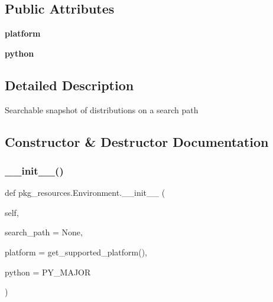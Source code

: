 \subsection*{Public Attributes}
\begin{DoxyCompactItemize}
\item 
\mbox{\label{classpkg__resources_1_1_environment_a8512772df91acc77fc4ea47e2d483e7a}} 
{\bfseries platform}
\item 
\mbox{\label{classpkg__resources_1_1_environment_a92643caa8139bba1bd63c32c22d1878c}} 
{\bfseries python}
\end{DoxyCompactItemize}


\subsection{Detailed Description}
\begin{DoxyVerb}Searchable snapshot of distributions on a search path\end{DoxyVerb}
 

\subsection{Constructor \& Destructor Documentation}
\mbox{\label{classpkg__resources_1_1_environment_ac17977fcfff1f90f694316f938090eb2}} 
\subsubsection{\texorpdfstring{\+\_\+\+\_\+init\+\_\+\+\_\+()}{\_\_init\_\_()}}
{\footnotesize\ttfamily def pkg\+\_\+resources.\+Environment.\+\_\+\+\_\+init\+\_\+\+\_\+ (\begin{DoxyParamCaption}\item[{}]{self,  }\item[{}]{search\+\_\+path = {\ttfamily None},  }\item[{}]{platform = {\ttfamily get\+\_\+supported\+\_\+platform()},  }\item[{}]{python = {\ttfamily PY\+\_\+MAJOR} }\end{DoxyParamCaption})}

